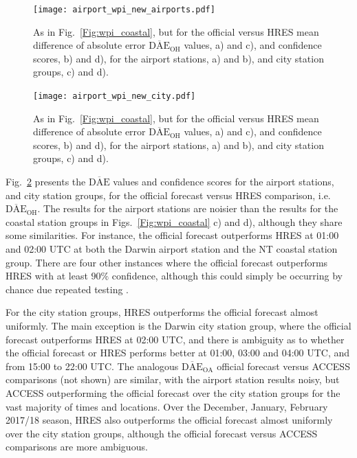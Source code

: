 \documentclass[twocol]{ametsoc}
\begin{document}
\begin{figure}
\centering
\texttt{[image: airport\_wpi\_new\_airports.pdf]}
\caption{As in Fig.~\ref{Fig:wpi_coastal}, but for the official versus HRES mean difference of absolute error $\overline{\text{DAE}}_\text{OH}$ values, a) and c), and confidence scores, b) and d), for the airport stations, a) and b), and city station groups, c) and d).}
\label{Fig:airport_wpi}
\end{figure}

\begin{figure}
\centering
\texttt{[image: airport\_wpi\_new\_city.pdf]}
\caption{As in Fig.~\ref{Fig:wpi_coastal}, but for the official versus HRES mean difference of absolute error $\overline{\text{DAE}}_\text{OH}$ values, a) and c), and confidence scores, b) and d), for the airport stations, a) and b), and city station groups, c) and d).}
\label{Fig:airport_wpi}
\end{figure}

Fig.~\ref{Fig:airport_wpi} presents the $\overline{\text{DAE}}$ values and confidence scores for the airport stations, and city station groups, for the official forecast versus HRES comparison, i.e.~$\overline{\text{DAE}}_\text{OH}$. The results for the airport stations are noisier than the results for the coastal station groups in Figs.~\ref{Fig:wpi_coastal} c) and d), although they share some similarities. For instance, the official forecast outperforms HRES at 01:00 and 02:00 UTC at both the Darwin airport station and the NT coastal station group. There are four other instances where the official forecast outperforms HRES with at least $90\%$ confidence, although this could simply be occurring by chance due repeated testing \citep[p. 178]{wilks11}.

For the city station groups, HRES outperforms the official forecast almost uniformly. The main exception is the Darwin city station group, where the official forecast outperforms HRES at 02:00 UTC, and there is ambiguity as to whether the official forecast or HRES performs better at 01:00, 03:00 and 04:00 UTC, and from 15:00 to 22:00 UTC. The analogous $\overline{\text{DAE}}_\text{OA}$ official forecast versus ACCESS comparisons (not shown) are similar, with the airport station results noisy, but ACCESS outperforming the official forecast over the city station groups for the vast majority of times and locations. Over the December, January, February 2017/18 season, HRES also outperforms the official forecast almost uniformly over the city station groups, although the official forecast versus ACCESS comparisons are more ambiguous. 
\end{document}
